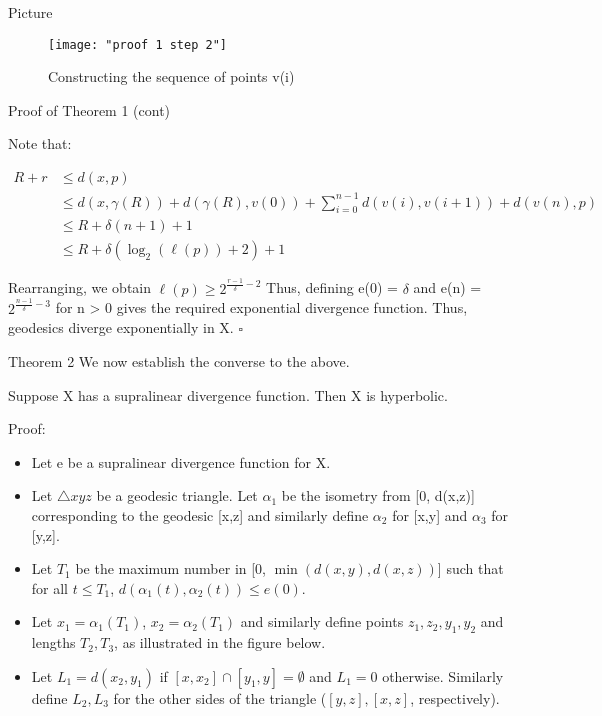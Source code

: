 \documentclass[11pt]{beamer}
\newcommand{\vs}{\vskip10pt}
\begin{document}
\begin{frame}{Picture}
	
	
\begin{figure}
	\centering
	\texttt{[image: "proof 1 step 2"]}
	\caption{Constructing the sequence of points v(i)}
	\label{fig:proof-1-step-2}
\end{figure}
	
\end{frame}

\begin{frame}{Proof of Theorem 1 (cont)}
	
	Note that:
	
	\begin{align*}
	R+r &\leq d(x, p) \\
	&\leq d(x, \gamma(R)) + d(\gamma(R), v(0))+ \sum_{i=0}^{n-1} d(v(i), v(i+1)) + d(v(n), p) \\
	&\leq R + \delta (n+1) + 1 \\
	&\leq R + \delta (\log_2(\ell(p))+2) + 1
	\end{align*}
	
	Rearranging, we obtain $\ell(p) \geq 2^{\frac{r-1}{\delta} - 2}$
	\vs
	Thus, defining e(0) = $\delta$ and e(n) = $2^{\frac{n-1}{\delta} - 3}$ for n > 0 gives the required exponential divergence function. Thus, geodesics diverge exponentially in X. 
	$\square$
	
\end{frame}

\begin{frame}{Theorem 2}
	We now establish the converse to the above. 
	
		\begin{theorem}
		
		Suppose X has a supralinear divergence function. Then X is hyperbolic. 
		
	\end{theorem}
	\vs
	Proof: 
	\begin{itemize}
		\item Let e be a supralinear divergence function for X. 
		\item Let $\triangle xyz$ be a geodesic triangle. Let $\alpha_1$ be the isometry from [0, d(x,z)] corresponding to the geodesic [x,z] and similarly define $\alpha_2$ for [x,y] and $\alpha_3$ for [y,z]. 
		\item Let $T_1$ be the maximum number in [0, $\min(d(x,y), d(x, z))$] such that for all $t \leq T_1$, $d(\alpha_1(t), \alpha_2(t)) \leq e(0)$. 
		\item Let $x_1 = \alpha_1(T_1)$, $x_2 = \alpha_2(T_1)$ and similarly define points $z_1, z_2, y_1, y_2$ and lengths $T_2, T_3$, as illustrated in the figure below. 
		\item Let $L_1 = d(x_2, y_1)$ if $[x, x_2] \cap [y_1, y] = \emptyset$ and $L_1 = 0$ otherwise. Similarly define $L_2, L_3$ for the other sides of the triangle ($[y,z],[x,z]$, respectively). 
	\end{itemize}
	
\end{frame}
	
\end{document}
